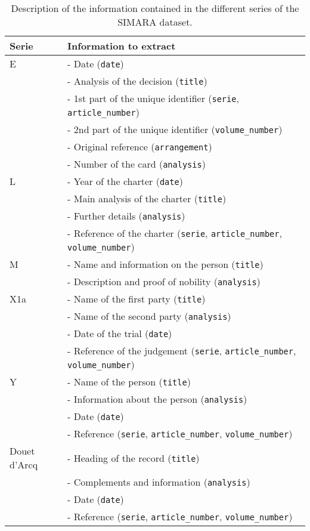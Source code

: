 \documentclass[runningheads]{llncs}
\begin{document}
\begin{table}[thb]
\centering
    \caption{Description of the information contained in the different series of the SIMARA dataset. }
    \label{tab:serie_description}
    \begin{tabular}{lp{}}
    \toprule
    \textbf{Serie} \phantom{--} & \textbf{Information to extract} \\
    \midrule
E &  - Date (\texttt{date})\\ & - Analysis of the decision (\texttt{title})\\ &  - 1st part of the unique identifier (\texttt{serie}, \texttt{article\_number}) \\ &  - 2nd part of the unique identifier (\texttt{volume\_number})\\ &  - Original reference (\texttt{arrangement})\\ &  - Number of the card (\texttt{analysis})\\\midrule
L  & - Year of the charter (\texttt{date}) \\&  - Main analysis of the charter (\texttt{title}) \\& - Further details (\texttt{analysis}) \\& - Reference of the charter (\texttt{serie}, \texttt{article\_number}, \texttt{volume\_number})\\\midrule
M & - Name and information on the person (\texttt{title}) \\&  - Description and proof of nobility (\texttt{analysis}) \\ \midrule
X1a & - Name of the first party (\texttt{title})\\&  - Name of the second party (\texttt{analysis})\\&  - Date of the trial (\texttt{date})\\&  - Reference of the judgement (\texttt{serie}, \texttt{article\_number}, \texttt{volume\_number})\\ \midrule
Y & - Name of the person  (\texttt{title})\\&   - Information about the person (\texttt{analysis})\\ &  - Date (\texttt{date})\\&  - Reference (\texttt{serie}, \texttt{article\_number}, \texttt{volume\_number})\\ \midrule
    Douet d'Arcq & - Heading of the record  (\texttt{title})\\&  - Complements and information (\texttt{analysis})\\ & - Date (\texttt{date})\\& - Reference (\texttt{serie}, \texttt{article\_number}, \texttt{volume\_number})\\ \bottomrule
\end{tabular}
\end{table}
\end{document}
